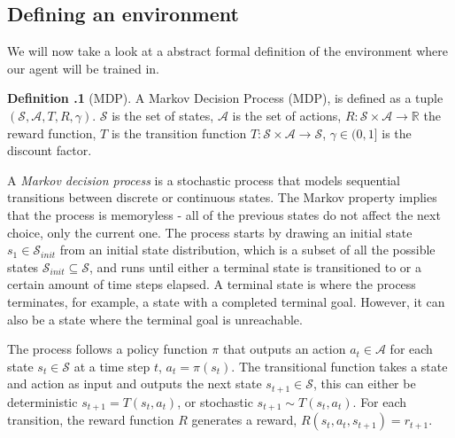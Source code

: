 \documentclass[12pt,A4]{report}
\theoremstyle{definition}
\newtheorem{definition}{Definition}[section]
\begin{document}

\subsection{Defining an environment}
We will now take a look at a abstract formal definition of the environment where our agent will be trained in.

\begin{displayquote}
  \textbf{Definition \thesection.1} (MDP).
  A Markov Decision Process (MDP), is defined as a tuple $(\mathcal{S}, \mathcal{A}, T, R, \gamma)$. $\mathcal{S}$ is the set of states, $\mathcal{A}$ is the set of actions, $R: \mathcal{S} \times \mathcal{A} \rightarrow \mathbb{R}$ the reward function, $T$ is the transition function $T: \mathcal{S} \times \mathcal{A} \rightarrow \mathcal{S}$, $\gamma \in (0, 1]$ is the discount factor.
\end{displayquote}

A \textit{Markov decision process} is a stochastic process that models sequential transitions between discrete or continuous states. The Markov property implies that the process is memoryless - all of the previous states do not affect the next choice, only the current one.  The process starts by drawing an initial state $s_1 \in \mathcal{S}_{init}$ from an initial state distribution, which is a subset of all the possible states $\mathcal{S}_{init} \subseteq \mathcal{S}$, and runs until either a terminal state is transitioned to or a certain amount of time steps elapsed. A terminal state is where the process terminates, for example, a state with a completed terminal goal. However, it can also be a state where the terminal goal is unreachable.

The process follows a policy function $\pi$ that outputs an action $a_t \in \mathcal{A}$ for each state $s_t \in \mathcal{S}$ at a time step $t$, $a_t = \pi(s_t)$. The transitional function takes a state and action as input and outputs the next state $s_{t+1} \in \mathcal{S}$, this can either be deterministic $s_{t+1} = T(s_t, a_t)$, or stochastic $s_{t+1} \sim T(s_t, a_t)$. For each transition, the reward function $R$  generates a reward, $R(s_t, a_t, s_{t+1}) = r_{t+1}$. 
\end{document}
